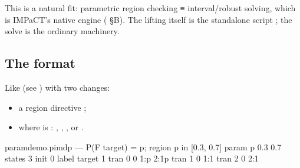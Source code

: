 \documentclass[a4paper,10pt,english]{sphinxmanual}
\begin{document}
\sphinxAtStartPar
This is a natural fit: parametric region checking ≡ interval/robust solving, which is
IMPaCT’s native engine ( \S{}B). The lifting itself is the standalone
script ; the solve is the ordinary
{\hyperref[\detokenize{manual/specifications::doc}]{}} machinery.


\subsection{The  format}
\label{\detokenize{manual/parametric:the-pimdp-format}}
\sphinxAtStartPar
Like  (see {\hyperref[\detokenize{manual/formats::doc}]{}}) with two changes:
\begin{itemize}
\item {} 
\sphinxAtStartPar
a region directive ;

\item {} 
\sphinxAtStartPar
{} where  is :
, , , or .

\end{itemize}

\begin{sphinxVerbatim}[commandchars=\\\{\}]
\PYGZsh{} param\PYGZus{}demo.pimdp — P(F target) = p; region p in [0.3, 0.7]
param p 0.3 0.7
states 3
init 0
label target 1
tran 0 0 1:p 2:1\PYGZhy{}p
tran 1 0 1:1
tran 2 0 2:1
\end{sphinxVerbatim}
\end{document}
